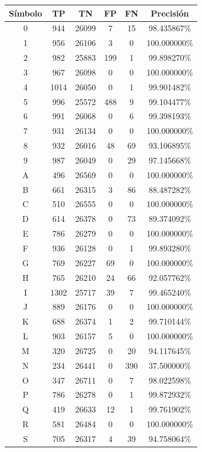 \documentclass[a4paper, 11pt, oneside]{report}
\begin{document}
\begin{table}
\centering
\begin{tabular}{|c|c|c|c|c|c|}
\hline
Símbolo & TP & TN & FP & FN & Precisión \\ 
\hline
0 & 944 & 26099 & 7 & 15 & 98.435867\% \\ 
1 & 956 & 26106 & 3 & 0 & 100.000000\% \\ 
2 & 982 & 25883 & 199 & 1 & 99.898270\% \\ 
3 & 967 & 26098 & 0 & 0 & 100.000000\% \\ 
4 & 1014 & 26050 & 0 & 1 & 99.901482\% \\ 
5 & 996 & 25572 & 488 & 9 & 99.104477\% \\ 
6 & 991 & 26068 & 0 & 6 & 99.398193\% \\ 
7 & 931 & 26134 & 0 & 0 & 100.000000\% \\ 
8 & 932 & 26016 & 48 & 69 & 93.106895\% \\ 
9 & 987 & 26049 & 0 & 29 & 97.145668\% \\ 
A & 496 & 26569 & 0 & 0 & 100.000000\% \\ 
B & 661 & 26315 & 3 & 86 & 88.487282\% \\ 
C & 510 & 26555 & 0 & 0 & 100.000000\% \\ 
D & 614 & 26378 & 0 & 73 & 89.374092\% \\ 
E & 786 & 26279 & 0 & 0 & 100.000000\% \\ 
F & 936 & 26128 & 0 & 1 & 99.893280\% \\ 
G & 769 & 26227 & 69 & 0 & 100.000000\% \\ 
H & 765 & 26210 & 24 & 66 & 92.057762\% \\ 
I & 1302 & 25717 & 39 & 7 & 99.465240\% \\ 
J & 889 & 26176 & 0 & 0 & 100.000000\% \\ 
K & 688 & 26374 & 1 & 2 & 99.710144\% \\ 
L & 903 & 26157 & 5 & 0 & 100.000000\% \\ 
M & 320 & 26725 & 0 & 20 & 94.117645\% \\ 
N & 234 & 26441 & 0 & 390 & 37.500000\% \\ 
O & 347 & 26711 & 0 & 7 & 98.022598\% \\ 
P & 786 & 26278 & 0 & 1 & 99.872932\% \\ 
Q & 419 & 26633 & 12 & 1 & 99.761902\% \\ 
R & 581 & 26484 & 0 & 0 & 100.000000\% \\ 
S & 705 & 26317 & 4 & 39 & 94.758064\% \\ 

\end{tabular}
\end{table}
\end{document}
